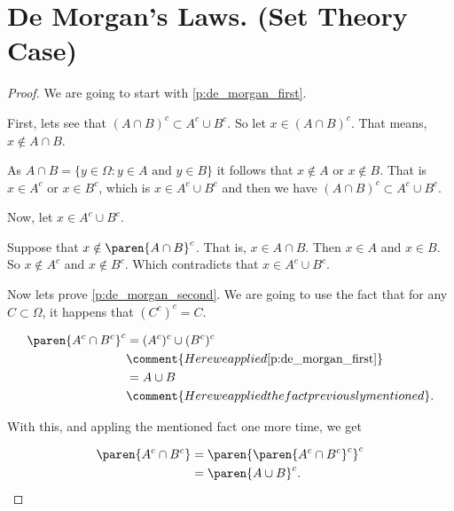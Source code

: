 ﻿\chapter{De Morgan's Laws. (Set Theory Case)}


\begin{proof}
    We are going to start with \eqref{p:de_morgan_first}.\pn
    
    First, lets see that $(A \cap B)^c \subset  A^c \cup B^c$. So let $x \in (A \cap B)^c$. That means,
    $x \notin A \cap B$.\pn
    
    As $A \cap  B = \{ y \in \Omega : y \in A \text{ and } y \in B \}$ it follows that
    $x \notin A$ or $x \notin B$. That is $x \in A^c$ or $x \in B^c$, which is $x \in A^c \cup B^c$ and then
    we have $(A \cap B)^c \subset  A^c \cup B^c$.\pn
    
    Now, let $x \in A^c \cup B^c$.\pn 
    
    Suppose that $x \notin \paren{A \cap B}^c$. That is, $x \in A \cap B$. Then $x \in A$ and $x \in B$. So
    $x \notin A^c$ and $x \notin B^c$. Which contradicts that $x \in A^c \cup B^c$.\pn
    
    Now lets prove \eqref{p:de_morgan_second}. We are going to use the fact that for any $C \subset \Omega$,
    it happens that $(C^c)^c = C$.\pn
    
    \begin{align}
        \paren{A^c \cap B^c}^c  &=  (A^c)^c \cup (B^c)^c                                    \\
                                &\comment{Here we applied \eqref{p:de_morgan_first}}        \\
                                &=  A \cup B                                                \\
                                &\comment{Here we applied the fact previously mentioned}.   \\
    \end{align}\pn
    
    With this, and appling the mentioned fact one more time, we get
    
    \begin{align}
        \paren{A^c \cap B^c}    &=  \paren{\paren{A^c \cap B^c}^c}^c        \\
                                &=  \paren{A \cup B}^c.
    \end{align}
\end{proof}